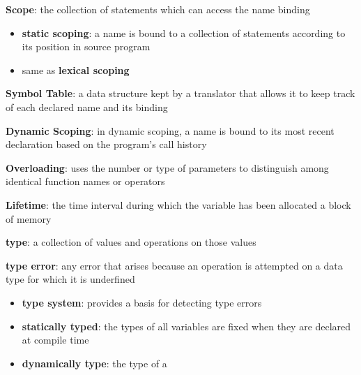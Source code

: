 \documentclass[11pt]{article} %
\begin{document}
{\bf Scope}: the collection of statements which can access the name binding
\begin{itemize}
\item {\bf static scoping}: a name is bound to a collection of statements according to its position in source program
\item same as {\bf lexical scoping}
\end{itemize}

{\bf Symbol Table}: a data structure kept by a translator that allows it to keep track of each declared name and its binding

\medskip
{\bf Dynamic Scoping}: in dynamic scoping, a name is bound to its most recent declaration based on the program's call history

\medskip
{\bf Overloading}: uses the number or type of parameters to distinguish among identical function names or operators

\medskip
{\bf Lifetime}: the time interval during which the variable has been allocated a block of memory

\medskip
{\bf type}: a collection of values and operations on those values

\medskip
{\bf type error}: any error that arises because an operation is attempted on a data type for which it is underfined
\begin{itemize}
\item {\bf type system}: provides a basis for detecting type errors
\item {\bf statically typed}: the types of all variables are fixed when they are declared at compile time
\item {\bf dynamically type}: the type of a 
\end{itemize}
\end{document}
